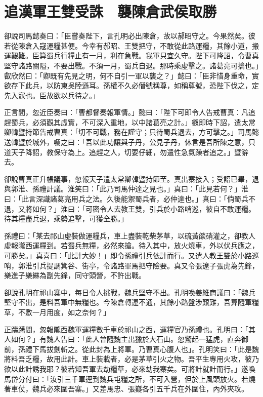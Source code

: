 
\chapter{追漢軍王雙受誅　襲陳倉武侯取勝}

卻說司馬懿奏曰：「臣嘗奏陛下，言孔明必出陳倉，故以郝昭守之。今果然矣。彼若從陳倉入寇運糧甚便。今幸有郝昭、王雙把守，不敢從此路運糧，其餘小道，搬運艱難。臣算蜀兵行糧止有一月，利在急戰。我軍只宜久守。陛下可降詔，令曹真堅守諸路關隘，不要出戰。不須一月，蜀兵自退。那時乘虛擊之。諸葛亮可擒也。」叡欣然曰：「卿既有先見之明，何不自引一軍以襲之？」懿曰：「臣非惜身重命，實欲存下此兵，以防東吳陸遜耳。孫權不久必僭號稱尊，如稱尊號，恐陛下伐之，定先入寇也。臣故欲以兵待之。」

正言間，忽近臣奏曰：「曹都督奏報軍情。」懿曰：「陛下可即令人告戒曹真：凡追趕蜀兵，必須觀其虛實，不可深入重地，以中諸葛亮之計。」叡即時下詔，遣太常卿韓暨持節告戒曹真：「切不可戰，務在謹守；只待蜀兵退去，方可擊之。」司馬懿送韓暨於城外，囑之曰：「吾以此功讓與子丹，公見子丹，休言是吾所陳之意，只道天子降詔，教保守為上。追趕之人，切要仔細，勿遣性急氣躁者追之。」暨辭去。

卻說曹真正升帳議事，忽報天子遣太常卿韓暨持節至。真出寨接入；受詔已畢，退與郭淮、孫禮計議。淮笑曰：「此乃司馬仲達之見也。」真曰：「此見若何？」淮曰：「此言深識諸葛亮用兵之法。久後能禦蜀兵者，必仲達也。」真曰：「倘蜀兵不退，又將如何？」淮曰：「可密令人去教王雙，引兵於小路哨巡，彼自不敢運糧。待其糧盡兵退，乘勢追擊，可獲全勝。」

孫禮曰：「某去祁山虛裝做運糧兵，車上盡裝乾柴茅草，以硫黃燄硝灌之，卻教人虛報隴西運糧到。若蜀兵無糧，必然來搶。待入其中，放火燒車，外以伏兵應之，可勝矣。」真喜曰：「此計大妙！」即令孫禮引兵依計而行。又遣人教王雙於小路巡哨，郭淮引兵提調箕谷、街亭，令諸路軍馬把守險要。真又令張遼子張虎為先鋒，樂進子樂綝為副先鋒，同守頭營，不許出戰。

卻說孔明在祁山寨中，每日令人挑戰，魏兵堅守不出。孔明喚姜維商議曰：「魏兵堅守不出，是料吾軍中無糧也。今陳倉轉運不通，其餘小路盤涉艱難，吾算隨軍糧草，不敷一月用度，如之奈何？」

正躊躇間，忽報隴西魏軍運糧數千車於祁山之西，運糧官乃孫禮也。孔明曰：「其人如何？」有魏人告曰：「此人曾隨魏主出獵於大石山。忽驚起一猛虎，直奔御前，孫禮下馬拔劍斬之。從此封為上將軍。乃曹真心腹人也」。孔明笑曰：「此是魏將料吾乏糧，故用此計。車上裝載者，必是茅草引火之物。吾平生專用火攻，彼乃欲以此計誘我耶？彼若知吾軍去劫糧草，必來劫我寨矣。可將計就計而行。」遂喚馬岱分付曰：「汝引三千軍逕到魏兵屯糧之所，不可入營，但於上風頭放火。若燒著車仗，魏兵必來圍吾寨。」又差馬忠、張嶷各引五千兵在外圍住，內外夾攻。

